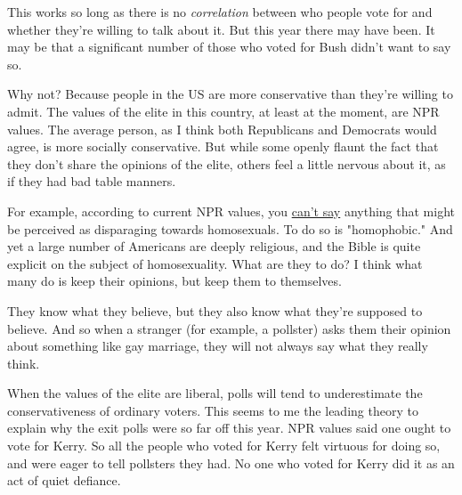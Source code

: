 This
                  works so long as there is no \emph{correlation} between who
                  people vote for and whether they're willing to talk about it.
                  But this year there may have been. It may be that a
                  significant number of those who voted for Bush didn't want to
                  say so.

Why not? Because people in the US are more
                  conservative than they're willing to admit. The values of the
                  elite in this country, at least at the moment, are NPR values.
                  The average person, as I think both Republicans and Democrats
                  would agree, is more socially conservative. But while some
                  openly flaunt the fact that they don't share the opinions of
                  the elite, others feel a little nervous about it, as if they
                  had bad table manners.

For example, according to
                  current NPR values, you
                  \href{http://www.paulgraham.com/say.html}{can't say} anything that might be
                  perceived as disparaging towards homosexuals. To do so is
                  "homophobic." And yet a large number of Americans are deeply
                  religious, and the Bible is quite explicit on the subject of
                  homosexuality. What are they to do? I think what many do is
                  keep their opinions, but keep them to themselves.

They
                  know what they believe, but they also know what they're
                  supposed to believe. And so when a stranger (for example, a
                  pollster) asks them their opinion about something like gay
                  marriage, they will not always say what they really think.

When
                  the values of the elite are liberal, polls will tend to
                  underestimate the conservativeness of ordinary voters. This
                  seems to me the leading theory to explain why the exit polls
                  were so far off this year. NPR values said one ought to vote
                  for Kerry. So all the people who voted for Kerry felt virtuous
                  for doing so, and were eager to tell pollsters they had. No
                  one who voted for Kerry did it as an act of quiet defiance.





              
            
          
